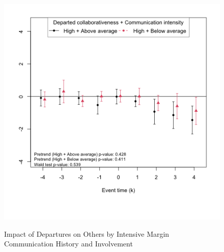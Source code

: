 \begin{figure}[htbp]
    \caption{Impact of Departures on Others by Intensive Margin Communication History and Involvement}
    \label{fig:prs_opened_comm_int_marg}
    \centering
    \begin{minipage}[b]{0.49\textwidth}
        \centering
         \label{fig:predep_prs_opened_high_collab_comm_int_marg_inv0}
        \includegraphics[width=\textwidth]{temp/output/collab_imp/inv0_cs_norm_prs_opened_dept_comm_avg_above_High.png}
    \end{minipage}
    \hfill
    \begin{minipage}[b]{0.49\textwidth}
        \centering
         \label{fig:predep_prs_opened_collab_comm_int_marg_inv0_avg2}

\end{minipage}
\end{figure}
